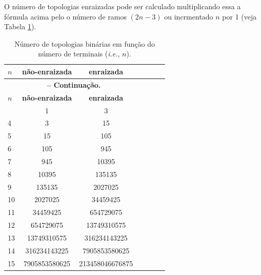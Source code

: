 \begin{refsection}
	O número de topologias enraizadas pode ser calculado multiplicando essa a fórmula acima pelo o número de ramos $(2n-3)$ ou incrmentado $n$ por 1 (veja Tabela \ref{tut3:table:enumeration}).



\pagestyle{fancy}
\begin{center}

\begin{longtable}{lcccccc}
\caption[Tabela \ref{tut3:table:enumeration}: Enumeração de topologias]{Número de topologias binárias em função do número de terminais (\textit{i.e.}, $n$).} \label{tut3:table:enumeration} \\


\hline\hline  \textbf{$n$} & \textbf{não-enraizada} & \textbf{enraizada}\\
\hline
\endfirsthead

\multicolumn{3}{c}{{\bfseries \tablename\ \thetable{} -- Continuação.}}\\
\hline\hline \textbf{$n$} & \textbf{não-enraizada} & \textbf{enraizada}\\

\endhead
\hline \hline
\endlastfoot
3 & 1 & 3\\
4 & 3 & 15\\
5 & 15 & 105\\
6 & 105 & 945\\
7 & 945 & 10395\\
8 & 10395 & 135135\\
9 & 135135 & 2027025\\
10 & 2027025 & 34459425\\
11 & 34459425 & 654729075\\
12 & 654729075 & 13749310575\\
13 & 13749310575 & 316234143225\\
14 & 316234143225 & 7905853580625\\
15 & 7905853580625 & 213458046676875\\

\end{longtable}
\end{center}


\end{refsection}
